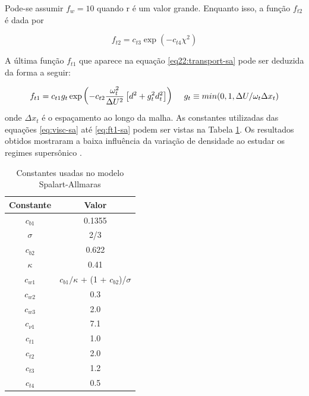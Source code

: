 Pode-se assumir \(f_w = 10\) quando r é um valor grande. Enquanto isso, a função \(f_{t2}\) é dada por

\begin{equation}
    f_{t2} = c_{t3}\exp{(-c_{t4}\chi^2)}
\end{equation}

A última função \(f_{t1}\) que aparece na equação \ref{eq22:transport-sa} pode ser deduzida da forma a seguir:

\begin{equation}
    \label{eq:ft1-sa}
    f_{t1} = c_{t1}g_{t} \exp{\left(-c_{t2}\frac{\omega_{t}^{2}}{\Delta U^2}\left[d^{2} + g_{t}^{2}d_{t}^{2}\right]\right)} \hspace{5mm} g_t \equiv min(0,1, \Delta U/\omega_t \Delta x_t)
\end{equation}
%
onde \(\Delta x_t\) é o espaçamento ao longo da malha. As constantes utilizadas das equações \ref{eq:visc-sa} até \ref{eq:ft1-sa} podem ser vistas na Tabela \ref{tab:tabela-constantes-spalart-allmaras}. Os resultados obtidos mostraram a baixa influência da variação de densidade ao estudar os regimes supersônico \cite{Spalart1992}.

\begin{table}[ht]
\centering
\caption[Constantes usadas no modelo Spalart-Allmaras.]{Constantes usadas no modelo Spalart-Allmaras \cite{Spalart1992}}
\vspace{0.5cm}
\begin{tabular}{c|c}
 
Constante 		& Valor \\
\hline
\(c_{b1}\) 		& \num{0,1355} \\
\(\sigma\) 		& 2/3 \\
\(c_{b2}\) 		& \num{0,622} \\
\(\kappa\) 		& \num{0,41} \\
\(c_{w1}\) 		& \(c_{b1}/\kappa\) + (1 + \(c_{b2}\))/\(\sigma\) \\
\(c_{w2}\) 		& \num{0,3} \\
\(c_{w3}\) 		& \num{2,0} \\
\(c_{\nu 1}\) 	& \num{7,1} \\
\(c_{t1}\) 		& \num{1,0} \\
\(c_{t2}\) 		& \num{2,0} \\
\(c_{t3}\) 		& \num{1,2} \\
\(c_{t4}\) 		& \num{0,5} \\

\end{tabular}
\label{tab:tabela-constantes-spalart-allmaras}
\end{table}

